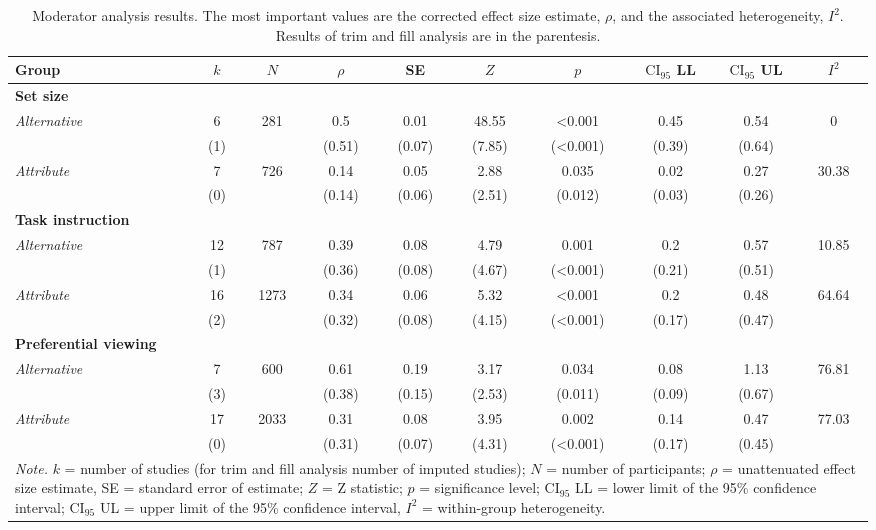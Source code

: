 \begin{table}[ht]
\centering
\caption{Moderator analysis results. The most important values are the corrected effect size estimate, $\rho$, and the associated heterogeneity, $I^2$. Results of trim and fill analysis are in the parentesis.} 
\label{tab:mod_results}
\begingroup\small
\begin{tabular}{lccccccccc}
  \hline
Group & $k$ & $N$ & $\rho$ & SE & $Z$ & $p$ & $\textrm{CI}_{95}$ LL & $\textrm{CI}_{95}$ UL & $I^2$ \\ 
  \hline
\textbf{Set size} &  &  &  &  &  &  &  &  &  \\ 
  \hspace{2mm}\textit{Alternative} & 6 & 281 & 0.5 & 0.01 & 48.55 & <0.001 & 0.45 & 0.54 & 0 \\ 
   & (1) &  & (0.51) & (0.07) & (7.85) & (<0.001) & (0.39) & (0.64) &  \\ 
  \hspace{2mm}\textit{Attribute} & 7 & 726 & 0.14 & 0.05 & 2.88 & 0.035 & 0.02 & 0.27 & 30.38 \\ 
   & (0) &  & (0.14) & (0.06) & (2.51) & (0.012) & (0.03) & (0.26) &  \\ 
  \textbf{Task instruction} &  &  &  &  &  &  &  &  &  \\ 
  \hspace{2mm}\textit{Alternative} & 12 & 787 & 0.39 & 0.08 & 4.79 & 0.001 & 0.2 & 0.57 & 10.85 \\ 
   & (1) &  & (0.36) & (0.08) & (4.67) & (<0.001) & (0.21) & (0.51) &  \\ 
  \hspace{2mm}\textit{Attribute} & 16 & 1273 & 0.34 & 0.06 & 5.32 & <0.001 & 0.2 & 0.48 & 64.64 \\ 
   & (2) &  & (0.32) & (0.08) & (4.15) & (<0.001) & (0.17) & (0.47) &  \\ 
  \textbf{Preferential viewing} &  &  &  &  &  &  &  &  &  \\ 
  \hspace{2mm}\textit{Alternative} & 7 & 600 & 0.61 & 0.19 & 3.17 & 0.034 & 0.08 & 1.13 & 76.81 \\ 
   & (3) &  & (0.38) & (0.15) & (2.53) & (0.011) & (0.09) & (0.67) &  \\ 
  \hspace{2mm}\textit{Attribute} & 17 & 2033 & 0.31 & 0.08 & 3.95 & 0.002 & 0.14 & 0.47 & 77.03 \\ 
   & (0) &  & (0.31) & (0.07) & (4.31) & (<0.001) & (0.17) & (0.45) &  \\ 
   \hline 
 \multicolumn{10}{p{0.9\textwidth}}{\scriptsize{\textit{Note.} $k$ = number of studies (for trim and fill analysis number of imputed studies); $N$ = number of participants; $\rho$ = unattenuated effect size estimate, SE = standard error of estimate; $Z$ = Z statistic; $p$ = significance level; $\textrm{CI}_{95}$ LL = lower limit of the 95\% confidence interval; $\textrm{CI}_{95}$ UL = upper limit of the 95\% confidence interval, $I^2$ = within-group heterogeneity.}} 
\end{tabular}
\endgroup
\end{table}

